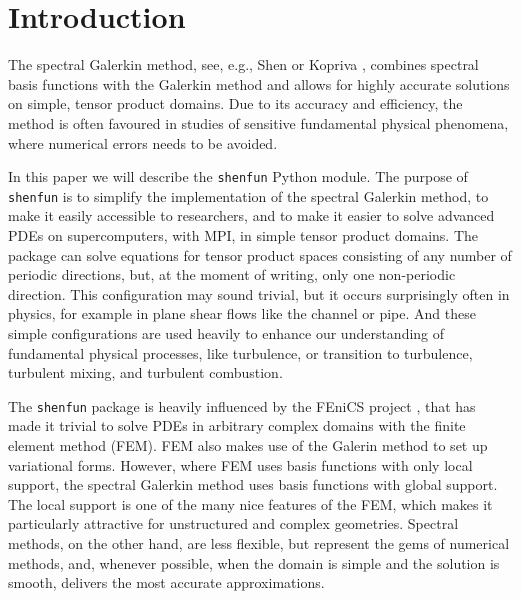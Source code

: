 \documentclass[%
oneside,                 %
final,                   %
10pt]{article}
\theoremstyle{definition}
\begin{document}
\tableofcontents


\vspace{1cm} %




    


\section{Introduction}
\label{sec:introduction}

The spectral Galerkin method, see, e.g., Shen \cite{shen95} or Kopriva \cite{kopriva09}, combines spectral basis functions with the Galerkin method and allows for highly accurate solutions on simple, tensor product domains. Due to its accuracy and efficiency, the method is often favoured in studies of sensitive fundamental physical phenomena, where numerical errors needs to be avoided. 

In this paper we will describe the \texttt{shenfun} Python module. The purpose of \texttt{shenfun} is to simplify the implementation of the spectral Galerkin method, to make it easily accessible to researchers, and to make it easier to solve advanced PDEs on supercomputers, with MPI, in simple tensor product domains. The package can solve equations for tensor product spaces consisting of any number of periodic directions, but, at the moment of writing, only one non-periodic direction. This configuration may sound trivial, but it occurs surprisingly often in physics, for example in plane shear flows like the channel or pipe. And these simple configurations are used heavily to enhance our understanding of fundamental physical processes, like turbulence, or transition to turbulence, turbulent mixing, and turbulent combustion.

The \texttt{shenfun} package is heavily influenced by the FEniCS project \cite{fenics}, that has made it trivial to solve PDEs in arbitrary complex domains with the finite element method (FEM). FEM also makes use of the Galerin method to set up variational forms. However, where FEM uses basis functions with only local support, the spectral Galerkin method uses basis functions with global support. The local support is one of the many nice features of the FEM, which makes it particularly attractive for unstructured and complex geometries. Spectral methods, on the other hand, are less flexible, but represent the gems of numerical methods, and, whenever possible, when the domain is simple and the solution is smooth, delivers the most accurate approximations.
\end{document}
